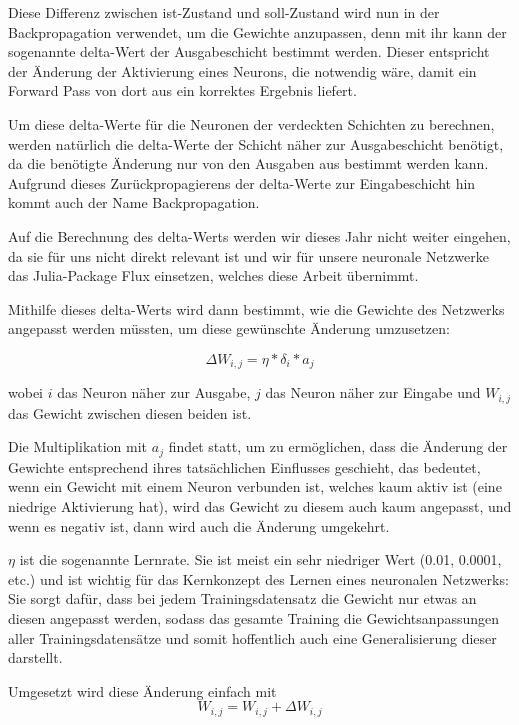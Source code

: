 \documentclass[10pt]{article}
\newcommand{\form}[1]{#1} %
\newcommand{\eng}[1]{\textit{#1}}
\begin{document}
Diese Differenz zwischen ist-Zustand und soll-Zustand wird nun in der Backpropagation verwendet, um die Gewichte anzupassen, denn mit ihr kann der sogenannte delta-Wert der Ausgabeschicht bestimmt werden.
Dieser entspricht der Änderung der Aktivierung eines Neurons, die notwendig wäre, damit ein Forward Pass von dort aus ein korrektes Ergebnis liefert.

Um diese delta-Werte für die Neuronen der verdeckten Schichten zu berechnen, werden natürlich die delta-Werte der Schicht näher zur Ausgabeschicht benötigt, da die benötigte Änderung nur von den Ausgaben aus bestimmt werden kann.
Aufgrund dieses Zurückpropagierens der delta-Werte zur Eingabeschicht hin kommt auch der Name Backpropagation.

Auf die Berechnung des delta-Werts werden wir dieses Jahr nicht weiter eingehen, da sie für uns nicht direkt relevant ist und wir für unsere neuronale Netzwerke das Julia-Package Flux einsetzen, welches diese Arbeit übernimmt.

Mithilfe dieses delta-Werts wird dann bestimmt, wie die Gewichte des Netzwerks angepasst werden müssten, um diese gewünschte Änderung umzusetzen:

\form{\[
	\Delta W_{i,j} = \eta * \delta_i * a_j
\]}

\noindent wobei $i$ das Neuron näher zur Ausgabe, $j$ das Neuron näher zur Eingabe und $W_{i,j}$ das Gewicht zwischen diesen beiden ist.

Die Multiplikation mit $a_j$ findet statt, um zu ermöglichen, dass die Änderung der Gewichte entsprechend ihres tatsächlichen Einflusses geschieht, das bedeutet, wenn ein Gewicht mit einem Neuron verbunden ist, welches kaum aktiv ist (eine niedrige Aktivierung hat), wird das Gewicht zu diesem auch kaum angepasst, und wenn es negativ ist, dann wird auch die Änderung umgekehrt.

$\eta$ ist die sogenannte Lernrate.
Sie ist meist ein sehr niedriger Wert (0.01, 0.0001, etc.) und ist wichtig für das Kernkonzept des Lernen eines neuronalen Netzwerks:
Sie sorgt dafür, dass bei jedem Trainingsdatensatz die Gewicht nur etwas an diesen angepasst werden, sodass das gesamte Training die Gewichtsanpassungen aller Trainingsdatensätze und somit hoffentlich auch eine Generalisierung dieser darstellt.

Umgesetzt wird diese Änderung einfach mit
\form{\[
    W_{i,j} = W_{i,j} + \Delta W_{i,j}
\]}
\end{document}
